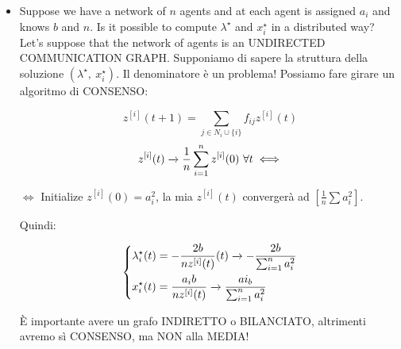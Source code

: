 \begin{itemize}
, e quindi questa è una funzione convessa (Non dobbiamo preoccuparci di avere $-\infty$ come $q(\lambda),\ \forall\lambda$).

$D=\{\lambda\ |\ \lambda\in\R\}$, e come calcoliamo il minimo di $L$ rispetto ad $x$? Imponiamo semplicemente le condizioni di stazionarietà: 

\[
	x_i^\star(\lambda) = -\lambda\frac{a_i}{2}
\]
quello è la $x$ che minimizza il mio Lagrangiano per un lambda $\lambda$ fissato (fixed).
A questo punto scriviamo la nostra $q(\lambda)$:

\[
	q(\lambda) = \sum_{i=1}^n{(\frac{\lambda^2a_i^2}{4} - \frac{\lambda^2a_i^2}{2})} -\lambda b =
\]
\[
	= -\sum_{i=1}^n{\frac{\lambda^2a_i^2}{4}}- \lambda b = -\lambda(b + \lambda\sum_{i=1}^n{\frac{a_i^2}{4}})
\]
\[
	q''(\lambda) = -\sum_{i=1}^n{\frac{a_i^2}{2}} < 0\ \forall\lambda
\]
(CONCAVE $q(\lambda)$).

A questo punto, se vogliamo scrivere il problema duale:

\[
	\max_\lambda{[-\lambda^2\sum_{i=1}^n{\frac{a_i^2}{4}} -\lambda b]} \implies
\]

\[
	\implies -2\lambda^{\star}\sum_{i=1}^n{\frac{a_i^2}{4}} -b = 0 \implies \lambda^\star = -\frac{2b}{\sum_{i=1}^n{a_i^2}}
\]

COMPUTE $q(\lambda^\star) = (\dots) = $ (FUNZIONE PRIMALE valutata in $\lambda^\star$) $\leftarrow$ VERIFY.

\[
	x_i(\lambda^\star) = -\lambda^\star\frac{a_i}{2} = \frac{a_ib}{\sum_{i=1}^n{a_i^2}} = x_i^\star
\]
(dalle condizioni di stazionarietà del I ordine (FNC)).

\[
	[x_i^\star = \frac{a_ib}{\sum_{i=1}^n{a_i^2}},\ \lambda^\star =  -\frac{2b}{\sum_{i=1}^n{a_i^2}}]
\]

\item Suppose we have a network of $n$ agents and at each agent is assigned $a_i$ and knows $b$ and $n$. Is it possible to compute $\lambda^\star$ and $x_i^\star$ in a distributed way? Let's suppose that the network of agents is an UNDIRECTED COMMUNICATION GRAPH. Supponiamo di sapere la struttura della soluzione $(\lambda^\star,\ x_i^\star)$. Il denominatore è un problema! Possiamo fare girare un algoritmo di CONSENSO:

\[
	z^{[i]}(t+1) = \sum_{j\in N_i\cup \{i\}}{f_{ij}z^{[i]}(t)}
\]
\[
	z^{[i]}(t) \tendsto{} \frac{1}{n}\sum_{i=1}^n{z^{[i]}(0)}\ \forall t \iff
\]

$\iff$ Initialize $z^{[i]}(0) = a_i^2$, la mia $z^{[i]}(t)$ convergerà ad $[\frac{1}{n}\sum{a_i^2}]$.

Quindi:

\[
	\left\{
	\begin{aligned}
	&\lambda_i^\star(t) = -\frac{2b}{nz^{[i]}(t)}(t) \tendsto{} -\frac{2b}{\sum_{i=1}^n{a_i^2}}\\
	&x_i^\star(t) = \frac{a_ib}{nz^{[i]}(t)} \tendsto{} \frac{ai_b}{\sum_{i=1}^n{a_i^2}}
	\end{aligned}
	\right.
\]

\`E importante avere un grafo INDIRETTO o BILANCIATO, altrimenti avremo sì CONSENSO, ma NON alla MEDIA!

\end{itemize}

